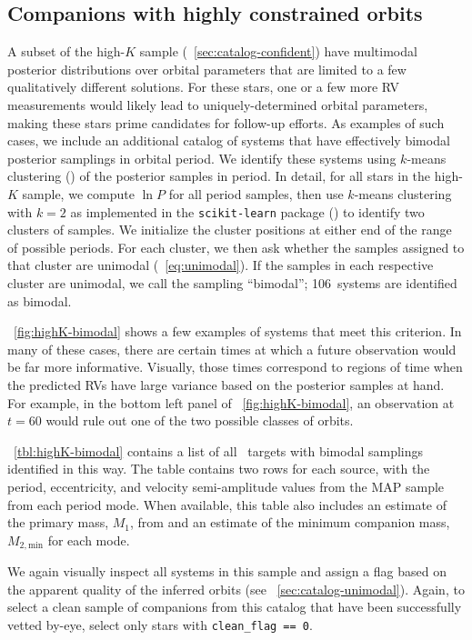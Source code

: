 \documentclass[modern, letterpaper]{aastex62}
\newcommand{\apogee}{\project{\acronym{APOGEE}}}
\newcommand{\nbimodal}{106}
\begin{document}
\subsection{Companions with highly constrained orbits}
\label{sec:catalog-multimodal}

A subset of the high-$K$ sample (\sectionname~\ref{sec:catalog-confident}) have
multimodal posterior distributions over orbital parameters that are limited to
a few qualitatively different solutions.
For these stars, one or a few more RV measurements would likely lead to
uniquely-determined orbital parameters, making these stars prime candidates for
follow-up efforts.
As examples of such cases, we include an additional catalog of systems that have
effectively bimodal posterior samplings in orbital period.
We identify these systems using $k$-means clustering (\citealt{Lloyd:1982}) of
the posterior samples in period.
In detail, for all stars in the high-$K$ sample, we compute $\ln P$ for all
period samples, then use $k$-means clustering with $k=2$ as implemented in the
\texttt{scikit-learn} package (\citealt{Pedregosa:2011}) to identify two
clusters of samples.
We initialize the cluster positions at either end of the range of possible
periods.
For each cluster, we then ask whether the samples assigned to that cluster are
unimodal (\eqname~\ref{eq:unimodal}).
If the samples in each respective cluster are unimodal, we call the sampling
``bimodal''; \nbimodal\ systems are identified as bimodal.

\figurename~\ref{fig:highK-bimodal} shows a few examples of systems that meet
this criterion.
In many of these cases, there are certain times at which a future observation
would be far more informative.
Visually, those times correspond to regions of time when the predicted RVs have
large variance based on the posterior samples at hand.
For example, in the bottom left panel of \figurename~\ref{fig:highK-bimodal}, an
observation at $t = 60$ would rule out one of the two possible  classes of
orbits.

\tablename~\ref{tbl:highK-bimodal} contains a list of all \apogee\ targets with
bimodal samplings identified in this way.
The table contains two rows for each source, with the period, eccentricity, and
velocity semi-amplitude values from the MAP sample from each period mode.
When available, this table also includes an estimate of the primary mass, $M_1$,
from \citet{Ness:2015} and an estimate of the minimum companion mass, $M_{2,
\textrm{min}}$ for each mode.

We again visually inspect all systems in this sample and assign a flag based on
the apparent quality of the inferred orbits (see
\sectionname~\ref{sec:catalog-unimodal}).
Again, to select a clean sample of companions from this catalog that have been
successfully vetted by-eye, select only stars with \texttt{clean\_flag == 0}.
\end{document}
